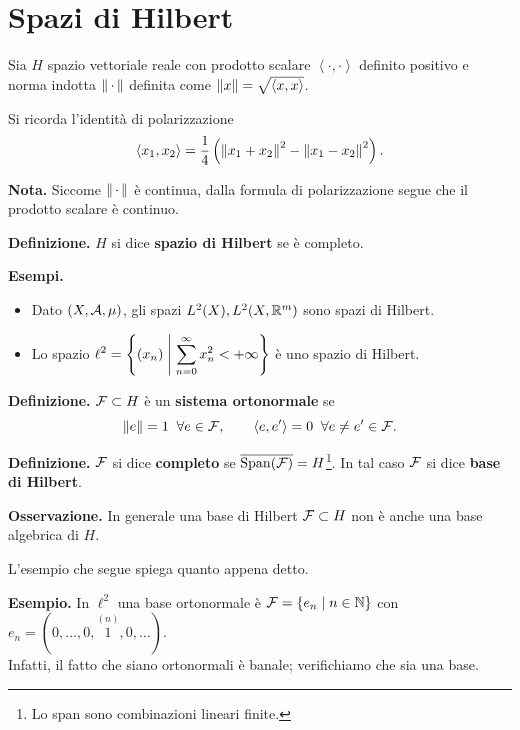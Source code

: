%
%

\chapter{Spazi di Hilbert}

Sia $H$ spazio vettoriale reale con prodotto scalare $\left<\cdot, \cdot \right>$ definito positivo e norma indotta $\left\lVert \,\cdot\, \right\rVert$ definita come $\left\lVert x \right\rVert = \sqrt{\left<x,x \right>}$.

Si ricorda l'identità di polarizzazione
%
$$
\left<x_1,x_2 \right> = \frac{1}{4} \left( \left\lVert x_1 + x_2 \right\rVert^2 - \left\lVert x_1 - x_2 \right\rVert^2 \right).
$$
%

\textbf{Nota.} Siccome $\left\lVert \,\cdot\, \right\rVert$ è continua, dalla formula di polarizzazione segue che il prodotto scalare è continuo.

\textbf{Definizione.} $H$ si dice \textbf{spazio di Hilbert} se è completo.

\textbf{Esempi.} 
\begin{itemize}
\item Dato $(X, \mathcal{A}, \mu )$, gli spazi $L^2(X), L^2(X, \mathbb R^m)$ sono spazi di Hilbert.

\item Lo spazio $\displaystyle \ell^2 = \left\{ (x_n) \;\middle|\; \sum_{n=0}^{\infty} x_n^2 < +\infty  \right\}$ è uno spazio di Hilbert.

\end{itemize}

\textbf{Definizione.} $\mathcal{F} \subset H$ è un \textbf{sistema ortonormale} se
%
$$
\left\lVert e \right\rVert = 1 \;\; \forall e \in \mathcal{F}, \qquad  \left<e,e' \right> = 0 \;\; \forall e \neq e' \in \mathcal{F}.
$$
%


\textbf{Definizione.} $\mathcal{F}$ si dice \textbf{completo} se $\overline{\operatorname{Span}(\mathcal{F})} = H$\footnote{Lo span sono combinazioni lineari finite.}. In tal caso $\mathcal{F}$ si dice \textbf{base di Hilbert}.

\vs

\textbf{Osservazione.} In generale una base di Hilbert $\mathcal{F} \subset H$ non è anche una base algebrica di $H$.

L'esempio che segue spiega quanto appena detto.

\textbf{Esempio.}
In $\ell^2$ una base ortonormale è $\mathcal{F} = \left\{ e_n \;\middle|\; n \in \mathbb N \right\}$ con $e_n = (0,\ldots ,0,\overset{(n)}{1},0,\ldots )$. \\
Infatti, il fatto che siano ortonormali è banale; verifichiamo che sia una base. 

